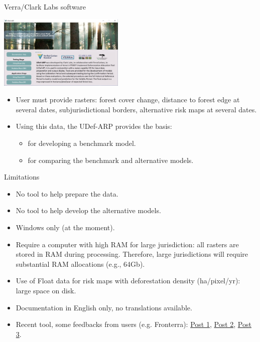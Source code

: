 \documentclass[10pt,table,dvipsnames,compress]{beamer}
\begin{document}
\begin{frame}[label={sec:org9bf3947}]{Verra/Clark Labs software}
\begin{center}
\includegraphics[width=6cm]{figs/verra_tool.png}
\end{center}

\begin{itemize}
\item User must provide rasters: forest cover change, distance to forest edge at several dates, subjurisdictional borders, alternative risk maps at several dates.
\item Using this data, the UDef-ARP provides the basis:
\begin{itemize}
\item for developing a benchmark model.
\item for comparing the benchmark and alternative models.
\end{itemize}
\end{itemize}
\end{frame}

\begin{frame}[label={sec:org6e5dc64}]{Limitations}
\begin{itemize}
\item No tool to help prepare the data.
\item No tool to help develop the alternative models.
\item Windows only (at the moment).
\item Require a computer with high RAM for large jurisdiction: all rasters are stored in RAM during processing. Therefore, large jurisdictions will require substantial RAM allocations (e.g., 64Gb).
\item Use of Float data for risk maps with deforestation density (ha/pixel/yr): large space on disk.
\item Documentation in English only, no translations available.
\item Recent tool, some feedbacks from users (e.g. Fronterra): \href{https://www.linkedin.com/posts/fron-terra\_forest-carbon-climatechange-activity-7179166090042732544-YnAK?utm\_source=share\&utm\_medium=member\_desktop}{Post 1}, \href{https://www.linkedin.com/posts/fron-terra\_forest-carbon-climatechange-activity-7179721587267371008-PRXr?utm\_source=share\&utm\_medium=member\_desktop}{Post 2}, \href{https://www.linkedin.com/posts/fron-terra\_carbon-climatechange-verra-activity-7180971577746862080-rolc?utm\_source=share\&utm\_medium=member\_desktop}{Post 3}.
\end{itemize}
\end{frame}
\end{document}
